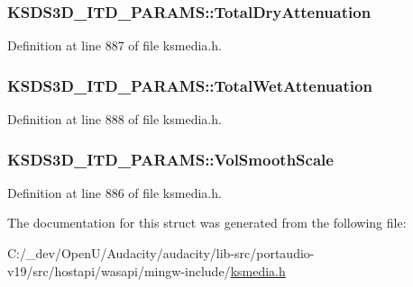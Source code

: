 \subsubsection[{\texorpdfstring{Total\+Dry\+Attenuation}{TotalDryAttenuation}}]{ K\+S\+D\+S3\+D\+\_\+\+I\+T\+D\+\_\+\+P\+A\+R\+A\+M\+S\+::\+Total\+Dry\+Attenuation}\hypertarget{struct_k_s_d_s3_d___i_t_d___p_a_r_a_m_s_abf337075f7e9e11ec8162595bab2c84d}{}\label{struct_k_s_d_s3_d___i_t_d___p_a_r_a_m_s_abf337075f7e9e11ec8162595bab2c84d}


Definition at line 887 of file ksmedia.\+h.

\subsubsection[{\texorpdfstring{Total\+Wet\+Attenuation}{TotalWetAttenuation}}]{ K\+S\+D\+S3\+D\+\_\+\+I\+T\+D\+\_\+\+P\+A\+R\+A\+M\+S\+::\+Total\+Wet\+Attenuation}\hypertarget{struct_k_s_d_s3_d___i_t_d___p_a_r_a_m_s_a5cd34e3a8f8efc60190fc8813cd8da65}{}\label{struct_k_s_d_s3_d___i_t_d___p_a_r_a_m_s_a5cd34e3a8f8efc60190fc8813cd8da65}


Definition at line 888 of file ksmedia.\+h.

\subsubsection[{\texorpdfstring{Vol\+Smooth\+Scale}{VolSmoothScale}}]{ K\+S\+D\+S3\+D\+\_\+\+I\+T\+D\+\_\+\+P\+A\+R\+A\+M\+S\+::\+Vol\+Smooth\+Scale}\hypertarget{struct_k_s_d_s3_d___i_t_d___p_a_r_a_m_s_a572985124e30e30adb8bbf83b419a970}{}\label{struct_k_s_d_s3_d___i_t_d___p_a_r_a_m_s_a572985124e30e30adb8bbf83b419a970}


Definition at line 886 of file ksmedia.\+h.



The documentation for this struct was generated from the following file\+:\begin{DoxyCompactItemize}
\item 
C\+:/\+\_\+dev/\+Open\+U/\+Audacity/audacity/lib-\/src/portaudio-\/v19/src/hostapi/wasapi/mingw-\/include/\hyperlink{ksmedia_8h}{ksmedia.\+h}\end{DoxyCompactItemize}
